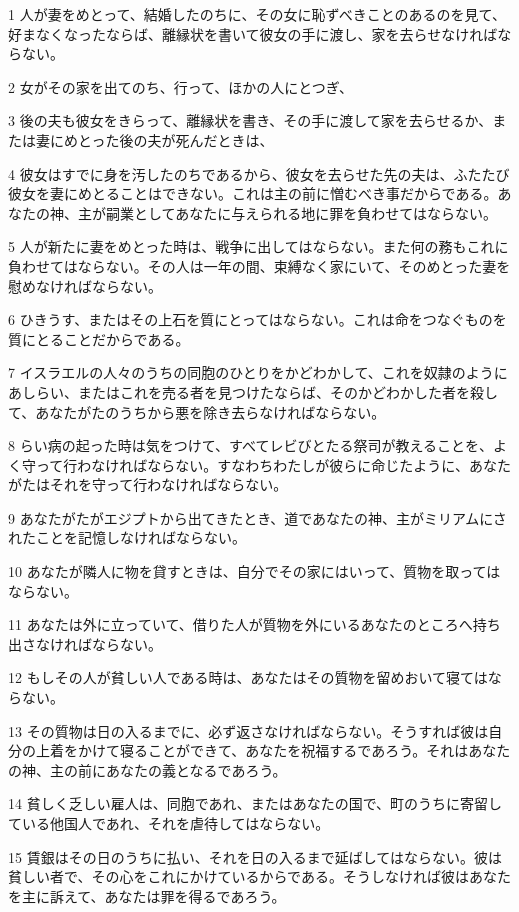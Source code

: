 \par 1 人が妻をめとって、結婚したのちに、その女に恥ずべきことのあるのを見て、好まなくなったならば、離縁状を書いて彼女の手に渡し、家を去らせなければならない。
\par 2 女がその家を出てのち、行って、ほかの人にとつぎ、
\par 3 後の夫も彼女をきらって、離縁状を書き、その手に渡して家を去らせるか、または妻にめとった後の夫が死んだときは、
\par 4 彼女はすでに身を汚したのちであるから、彼女を去らせた先の夫は、ふたたび彼女を妻にめとることはできない。これは主の前に憎むべき事だからである。あなたの神、主が嗣業としてあなたに与えられる地に罪を負わせてはならない。
\par 5 人が新たに妻をめとった時は、戦争に出してはならない。また何の務もこれに負わせてはならない。その人は一年の間、束縛なく家にいて、そのめとった妻を慰めなければならない。
\par 6 ひきうす、またはその上石を質にとってはならない。これは命をつなぐものを質にとることだからである。
\par 7 イスラエルの人々のうちの同胞のひとりをかどわかして、これを奴隷のようにあしらい、またはこれを売る者を見つけたならば、そのかどわかした者を殺して、あなたがたのうちから悪を除き去らなければならない。
\par 8 らい病の起った時は気をつけて、すべてレビびとたる祭司が教えることを、よく守って行わなければならない。すなわちわたしが彼らに命じたように、あなたがたはそれを守って行わなければならない。
\par 9 あなたがたがエジプトから出てきたとき、道であなたの神、主がミリアムにされたことを記憶しなければならない。
\par 10 あなたが隣人に物を貸すときは、自分でその家にはいって、質物を取ってはならない。
\par 11 あなたは外に立っていて、借りた人が質物を外にいるあなたのところへ持ち出さなければならない。
\par 12 もしその人が貧しい人である時は、あなたはその質物を留めおいて寝てはならない。
\par 13 その質物は日の入るまでに、必ず返さなければならない。そうすれば彼は自分の上着をかけて寝ることができて、あなたを祝福するであろう。それはあなたの神、主の前にあなたの義となるであろう。
\par 14 貧しく乏しい雇人は、同胞であれ、またはあなたの国で、町のうちに寄留している他国人であれ、それを虐待してはならない。
\par 15 賃銀はその日のうちに払い、それを日の入るまで延ばしてはならない。彼は貧しい者で、その心をこれにかけているからである。そうしなければ彼はあなたを主に訴えて、あなたは罪を得るであろう。
